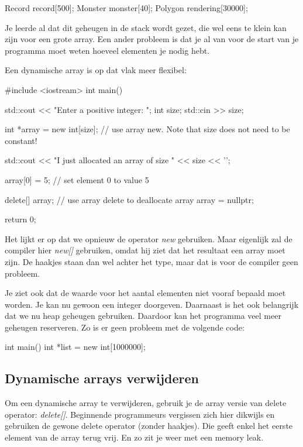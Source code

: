 \documentclass[11pt, oldfontcommands, oneside, a4paper]{memoir}
\begin{document}
\begin{code}
Record record[500]; 
Monster monster[40];
Polygon rendering[30000]; 
\end{code}

Je leerde al dat dit geheugen in de stack wordt gezet, die wel eens te klein kan zijn voor een grote array. Een ander probleem is dat je al van voor de start van je programma moet weten hoeveel elementen je nodig hebt.

Een dynamische array is op dat vlak meer flexibel:

\begin{code} 
#include <iostream>
int main()
{
    std::cout << "Enter a positive integer: ";
    int size;
    std::cin >> size;
 
    int *array = new int[size]; // use array new.  Note that size does not need to be constant!
 
    std::cout << "I just allocated an array of size " << size << '\n';
 
    array[0] = 5; // set element 0 to value 5
 
    delete[] array; // use array delete to deallocate array
    array = nullptr; 
 
    return 0;
}
\end{code}

Het lijkt er op dat we opnieuw de operator \textsl{new} gebruiken. Maar eigenlijk zal de compiler hier \textsl{new[]} gebruiken, omdat hij ziet dat het resultaat een array moet zijn. De haakjes staan dan wel achter het type, maar dat is voor de compiler geen probleem.

Je ziet ook dat de waarde voor het aantal elementen niet vooraf bepaald moet worden. Je kan nu gewoon een integer doorgeven. Daarnaast is het ook belangrijk dat we nu heap geheugen gebruiken. Daardoor kan het programma veel meer geheugen reserveren. Zo is er geen probleem met de volgende code:

\begin{code}
int main() {
  int *list = new int[1000000];
}
\end{code}

\subsection{Dynamische arrays verwijderen}
Om een dynamische array te verwijderen, gebruik je de array versie van delete operator: \textsl{delete[]}. Beginnende programmeurs vergissen zich hier dikwijls en gebruiken de gewone delete operator (zonder haakjes). Die geeft enkel het eerste element van de array terug vrij. En zo zit je weer met een memory leak.
\end{document}
